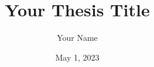 \documentclass[draft]{cmustatthesis} %
\title{Your Thesis Title}
\date{May 1, 2023}
\author{Your Name}
\begin{document}
\frontmatter

\begin{titlingpage}
  

  \cleartorecto

  \maketitle
  \makecopyright

  \cleartorecto
\end{titlingpage}




\cleartorecto
\tableofcontents

\cleartorecto
\listoftables

\cleartorecto
\listoffigures

\mainmatter

\pagestyle{ruled}





\appendix


\end{document}
